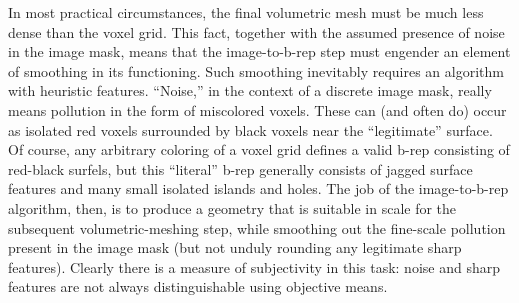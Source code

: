 In most practical circumstances, the final volumetric mesh
must be much less dense than the voxel grid.  This fact, together with the assumed presence of noise in the image mask, means that the image-to-b-rep step must engender an element of smoothing in its functioning.  Such smoothing inevitably requires an algorithm with heuristic features.  ``Noise,'' in the context of a discrete image mask, really means pollution in the form of miscolored voxels.  These can (and often do) occur as isolated red voxels surrounded by black voxels near the ``legitimate'' surface.  Of course, any arbitrary coloring of a voxel grid defines a valid b-rep consisting of red-black surfels, but this ``literal'' b-rep generally consists of jagged surface features and many small isolated islands and holes.  The job of the image-to-b-rep algorithm, then, is to produce a geometry that is suitable in scale for the subsequent volumetric-meshing step, while smoothing out the fine-scale pollution present in the image mask (but not unduly rounding any legitimate sharp features).  Clearly there is a measure of subjectivity in this task:  noise and sharp features are not always distinguishable using objective means.
